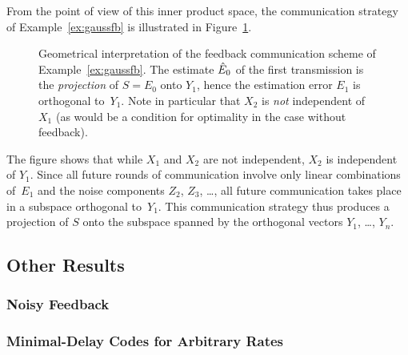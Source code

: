 From the point of view of this inner product space, the communication strategy
of Example~\ref{ex:gaussfb} is illustrated in Figure~\ref{fig:gaussfb1}.
\begin{figure}[tbp]
  \begin{center}
    
  \end{center}
  \caption{Geometrical interpretation of the feedback communication scheme of
  Example~\ref{ex:gaussfb}. The estimate $\hat{E}_0$ of the first transmission is
  the \emph{projection} of $S = E_0$ onto $Y_1$, hence the estimation error
  $E_1$ is orthogonal to~$Y_1$. Note in particular that $X_2$ is \emph{not}
  independent of $X_1$ (as would be a condition for optimality in the case
  without feedback).}
  \label{fig:gaussfb1}
\end{figure}
The figure shows that while $X_1$ and $X_2$ are not independent, $X_2$ is
independent of $Y_1$. Since all future rounds of communication involve only
linear combinations of~$E_1$ and the noise components $Z_2$, $Z_3$, \dots, all
future communication takes place in a subspace orthogonal to~$Y_1$. This
communication strategy thus produces a projection of $S$ onto the subspace
spanned by the orthogonal vectors $Y_1$, \ldots, $Y_n$.




\subsection{Other Results}

\subsubsection{Noisy Feedback}

\subsubsection{Minimal-Delay Codes for Arbitrary Rates}


